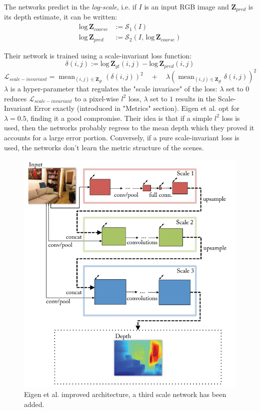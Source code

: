 The networks predict in the \textit{log-scale}, i.e. if $I$ is an input RGB image and $\mathbf{Z}_{pred}$ is its depth estimate, it can be written:
\begin{equation}
	\begin{split}
	\text{log} \, \mathbf{Z}_{coarse} & := \mathcal{S}_{1}(I) \\
	\text{log} \, \mathbf{Z}_{pred} & := \mathcal{S}_{2}(I, \, \text{log} \, \mathbf{Z}_{coarse})
	\end{split}
\end{equation}

Their network is trained using a scale-invariant loss function:
\[
	\delta(i,j) := \text{log} \, \mathbf{Z}_{gt} (i,j) - \text{log} \, \mathbf{Z}_{pred} (i,j)
\]\[
	\mathcal{L}_{scale-invariant} =
	\mathop{\text{mean}}_{(i,j) \in \mathbf{Z}_{gt}} \left( \delta(i,j) \right)^{2} \quad +\quad
	\lambda \left( \mathop{\text{mean}}_{(i,j) \in \mathbf{Z}_{gt}} \delta(i,j) \right) ^{2}
\]
$\lambda$ is a hyper-parameter that regulates the "scale invariace" of the loss: $\lambda$ set to $0$ reduces $\mathcal{L}_{scale-invariant}$ to a pixel-wise $l^{2}$ loss, $\lambda$ set to $1$ results in the Scale-Invariant Error exactly (introduced in "Metrics" section).
Eigen et al. opt for $\lambda = 0.5$, finding it a good compromise.
Their idea is that if a simple $l^{2}$ loss is used, then the networks probably regress to the mean depth which they proved it accounts for a large error portion.
Conversely, if a pure scale-invariant loss is used, the networks don't learn the metric structure of the scenes.

\begin{figure}
\centering
\includegraphics[scale=0.5]{figs/Eigen2}
\caption{Eigen et al. \cite{Eigen2} improved architecture, a third scale network has been added.}
\label{fig:Eigen2}
\end{figure}

